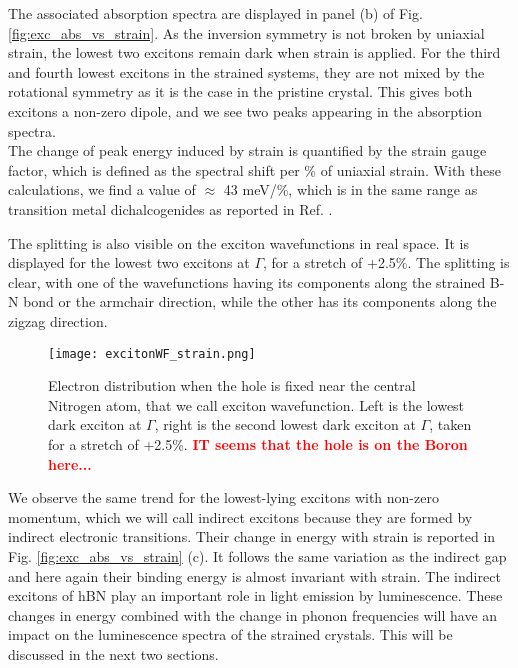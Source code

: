 The associated absorption spectra are displayed in panel (b) of Fig. \ref{fig:exc_abs_vs_strain}. As the inversion symmetry is not broken by uniaxial strain, the lowest two excitons remain dark when strain is applied. For the third and fourth lowest excitons in the strained systems, they are not mixed by the rotational symmetry as it is the case in the pristine crystal. This gives both excitons a non-zero dipole, and we see two peaks appearing in the absorption spectra. \\
The change of peak energy induced by strain is quantified by the strain gauge factor, which is defined as the spectral shift per \% of uniaxial strain. With these calculations, we find a value of $\approx$ 43 meV/\%, which is in the same range as transition metal dichalcogenides as reported in Ref. \cite{carrascoso2021strain}.

The splitting is also visible on the exciton wavefunctions in real space. It is displayed for the lowest two excitons at $\Gamma$, for a stretch of +2.5\%. The splitting is clear, with one of the wavefunctions having its components along the strained B-N bond or the armchair direction, while the other has its components along the zigzag direction.
\begin{figure}[h!tbp]
	\vspace{0.2cm}
	\setcapindent{2em}
	\centering
	\texttt{[image: excitonWF\_strain.png]}
	\caption{Electron distribution when the hole is fixed near the central Nitrogen atom, that we call exciton wavefunction. Left is the lowest dark exciton at $\Gamma$, right is the second lowest dark exciton at $\Gamma$, taken for a stretch of +2.5\%. \textcolor{red}{\textbf{IT seems that the hole is on the Boron here...}} }
	\label{fig:excWF_strain}
\end{figure}

We observe the same trend for the lowest-lying excitons with non-zero momentum, which we will call indirect excitons because they are formed by indirect electronic transitions. Their change in energy with strain is reported in Fig. \ref{fig:exc_abs_vs_strain} (c). It follows the same variation as the indirect gap and here again their binding energy is almost invariant with strain. The indirect excitons of hBN play an important role in light emission by luminescence. These changes in energy combined with the change in phonon frequencies will have an impact on the luminescence spectra of the strained crystals. This will be discussed in the next two sections.

